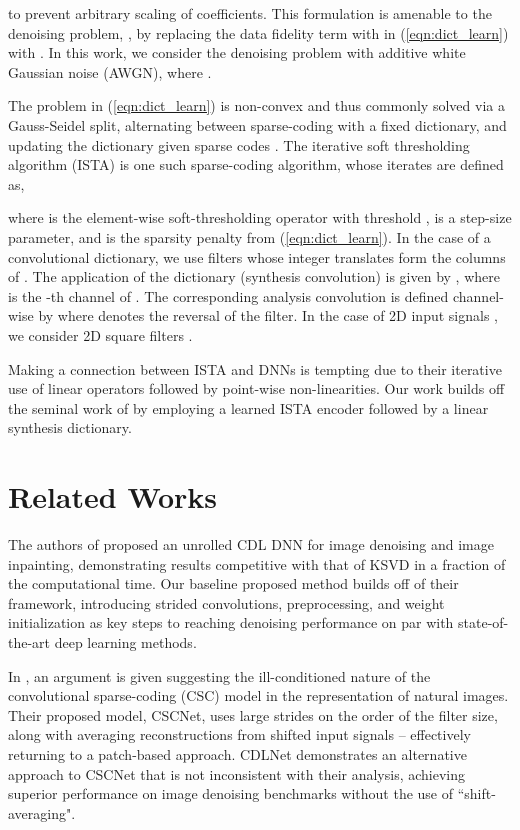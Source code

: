 \documentclass[conference]{IEEEtran}
\newcommand{\soa}{state-of-the-art }
\begin{document}
to prevent arbitrary scaling of coefficients.
This formulation is amenable to the denoising problem, , by replacing the data fidelity term with in (\ref{eqn:dict_learn}) with . In this work, we consider the denoising problem with additive white Gaussian noise
(AWGN), where .

The problem in (\ref{eqn:dict_learn}) is non-convex and thus commonly solved via a Gauss-Seidel split, alternating between sparse-coding with a fixed dictionary, and updating the dictionary given sparse codes \cite{KSVD}. The iterative soft thresholding algorithm (ISTA) is one such sparse-coding algorithm, whose iterates are defined as,

where  is the element-wise soft-thresholding operator with threshold ,  is a step-size parameter, and  is the sparsity penalty from (\ref{eqn:dict_learn}). In the case of a convolutional dictionary, we use  filters  whose integer translates form the columns of . The application of the dictionary (synthesis convolution) is given by 
, where  is the -th channel of . 
The corresponding analysis convolution is defined channel-wise by  where  denotes the reversal of the filter. In the case of 2D input signals , we consider 2D square filters . 

Making a connection between ISTA and DNNs is tempting due to their iterative use of linear operators followed by point-wise non-linearities. Our work builds off the seminal work of \cite{Gregor2010} by employing a learned ISTA encoder followed by a linear synthesis dictionary.

\section{Related Works}
The authors of \cite{Sreter2018} proposed an unrolled CDL DNN for image denoising and image inpainting, demonstrating results competitive with that of KSVD \cite{KSVD} in a fraction of the computational time. Our baseline proposed method builds off of their framework, introducing strided convolutions, preprocessing, and weight initialization as key steps to reaching denoising performance on par with \soa deep learning methods.

In \cite{Simon2019}, an argument is given suggesting the ill-conditioned nature of the convolutional sparse-coding (CSC) model in the representation of natural images. Their proposed model, CSCNet, uses large strides on the order of the filter size, along with averaging reconstructions from shifted input signals -- effectively returning to a patch-based approach. CDLNet demonstrates an alternative approach to CSCNet that is not inconsistent with their analysis, achieving superior performance on image denoising benchmarks without the use of ``shift-averaging".
\end{document}
